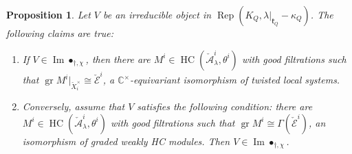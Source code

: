 \documentclass[12pt]{amsart}
\newcommand{\C}{\mathbb{C}}
\newcommand{\A}{\mathcal{A}}
\newcommand{\gr}{\operatorname{gr}}
\newcommand{\kf}{\mathfrak{k}}
\newcommand{\HC}{\operatorname{HC}}
\newtheorem{Prop}[Thm]{Proposition}
\theoremstyle{definition}
\numberwithin{equation}{section}
\begin{document}
\begin{Prop}\label{Lem:image_description11}
Let $V$ be an irreducible object in $\operatorname{Rep}(K_Q,\lambda|_{\kf_Q}-\kappa_Q)$. The following claims are true:
\begin{enumerate}
\item If $V\in \operatorname{Im}\bullet_{\dagger,\chi}$, then there are
$M^i\in \HC(\check{\A}^i_\lambda,\theta^i)$ with good filtrations such that
$\gr M^i|_{\check{X}_i^\times}\cong \check{\mathcal{E}}^i$, a $\C^\times$-equivariant isomorphism of twisted
local systems.
\item Conversely, assume that $V$ satisfies the following condition:
there are $M^i\in \HC(\check{\A}^i_\lambda,\theta^i)$ with good filtrations such that
$\gr M^i\cong \Gamma(\check{\mathcal{E}}^i)$, an isomorphism of graded weakly HC modules.
Then $V\in \operatorname{Im}\bullet_{\dagger,\chi}$.
\end{enumerate}
\end{Prop}
\end{document}
